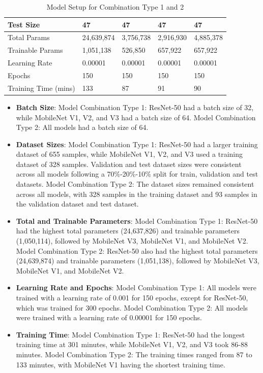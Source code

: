 \begin{table}[H]
\begin{tabularx}{\textwidth}{@{} *5{X} @{}}
Test Size            &  47         &  47            & 47             & 47             \\ \midrule
\raggedright Total Params     &  24,639,874         & 3,756,738             &  2,916,930            &  4,885,378            \\ \midrule
\raggedright Trainable Params &  1,051,138         &  526,850            &  657,922            &  657,922            \\ \midrule
Learning Rate        & 0.00001          &  0.00001            &  0.00001            &  0.00001            \\ \midrule
Epochs               & 150          &   150           &  150            &  150             \\ \midrule
Training Time (mins)       & 133          &   87           &  91            &  90             \\ \midrule
\bottomrule
\end{tabularx}
\caption{Model Setup for Combination Type 1 and 2 }
\label{table:results_1}
\end{table}


\begin{itemize}
    \item \textbf{Batch Size}: Model Combination Type 1: ResNet-50 had a batch size of 32, while MobileNet V1, V2, and V3 had a batch size of 64. Model Combination Type 2: All models had a batch size of 64.
    \item \textbf{Dataset Sizes}: Model Combination Type 1: ResNet-50 had a larger training dataset of 655 samples, while MobileNet V1, V2, and V3 used a training dataset of 328 samples. Validation and test dataset sizes were consistent across all models following a 70\%-20\%-10\% split for train, validation and test datasets. Model Combination Type 2: The dataset sizes remained consistent across all models, with 328 samples in the training dataset and 93 samples in the validation dataset and test dataset.
    \item \textbf{Total and Trainable Parameters}: Model Combination Type 1: ResNet-50 had the highest total parameters (24,637,826) and trainable parameters (1,050,114), followed by MobileNet V3, MobileNet V1, and MobileNet V2. Model Combination Type 2: ResNet-50 also had the highest total parameters (24,639,874) and trainable parameters (1,051,138), followed by MobileNet V3, MobileNet V1, and MobileNet V2.
    \item \textbf{Learning Rate and Epochs}: Model Combination Type 1: All models were trained with a learning rate of 0.001 for 150 epochs, except for ResNet-50, which was trained for 300 epochs. Model Combination Type 2: All models were trained with a learning rate of 0.00001 for 150 epochs.
    \item \textbf{Training Time}: Model Combination Type 1: ResNet-50 had the longest training time at 301 minutes, while MobileNet V1, V2, and V3 took 86-88 minutes. Model Combination Type 2: The training times ranged from 87 to 133 minutes, with MobileNet V1 having the shortest training time.

\end{itemize}


